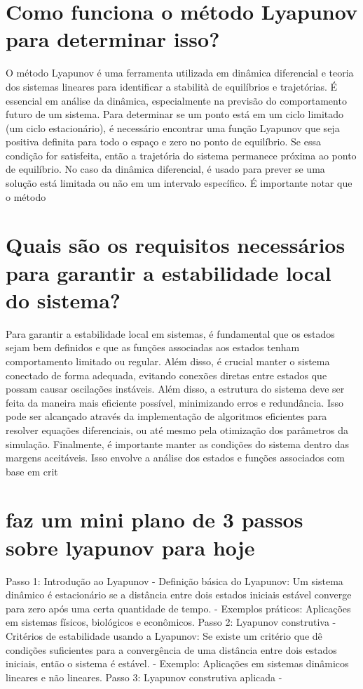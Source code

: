 \documentclass[11pt,a4paper]{article}
\begin{document}
\section{Como funciona o método Lyapunov para determinar isso?}
O método Lyapunov é uma ferramenta utilizada em dinâmica diferencial e teoria dos sistemas lineares para identificar a stabilità de equilíbrios e trajetórias. É essencial em análise da dinâmica, especialmente na previsão do comportamento futuro de um sistema. Para determinar se um ponto está em um ciclo limitado (um ciclo estacionário), é necessário encontrar uma função Lyapunov que seja positiva definita para todo o espaço e zero no ponto de equilíbrio. Se essa condição for satisfeita, então a trajetória do sistema permanece próxima ao ponto de equilíbrio. No caso da dinâmica diferencial, é usado para prever se uma solução está limitada ou não em um intervalo específico. É importante notar que o método

\section{Quais são os requisitos necessários para garantir a estabilidade local do sistema?}
Para garantir a estabilidade local em sistemas, é fundamental que os estados sejam bem definidos e que as funções associadas aos estados tenham comportamento limitado ou regular. Além disso, é crucial manter o sistema conectado de forma adequada, evitando conexões diretas entre estados que possam causar oscilações instáveis. Além disso, a estrutura do sistema deve ser feita da maneira mais eficiente possível, minimizando erros e redundância. Isso pode ser alcançado através da implementação de algoritmos eficientes para resolver equações diferenciais, ou até mesmo pela otimização dos parâmetros da simulação. Finalmente, é importante manter as condições do sistema dentro das margens aceitáveis. Isso envolve a análise dos estados e funções associados com base em crit

\section{faz um mini plano de 3 passos sobre lyapunov para hoje}
Passo 1: Introdução ao Lyapunov - Definição básica do Lyapunov: Um sistema dinâmico é estacionário se a distância entre dois estados iniciais estável converge para zero após uma certa quantidade de tempo. - Exemplos práticos: Aplicações em sistemas físicos, biológicos e econômicos. Passo 2: Lyapunov construtiva - Critérios de estabilidade usando a Lyapunov: Se existe um critério que dê condições suficientes para a convergência de uma distância entre dois estados iniciais, então o sistema é estável. - Exemplo: Aplicações em sistemas dinâmicos lineares e não lineares. Passo 3: Lyapunov construtiva aplicada -
\end{document}
